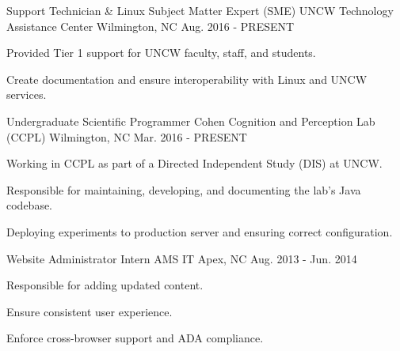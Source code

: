 

\begin{cventries}

  \cventry
    {Support Technician \& Linux Subject Matter Expert (SME)} %
    {UNCW Technology Assistance Center} %
    {Wilmington, NC} %
    {Aug. 2016 - PRESENT} %
    {
      \begin{cvitems} %
        \item {Provided Tier 1 support for UNCW faculty, staff, and students.}
        \item {Create documentation and ensure interoperability with Linux and UNCW services.}
      \end{cvitems}
    }

  \cventry
    {Undergraduate Scientific Programmer} %
    {Cohen Cognition and Perception Lab (CCPL)} %
    {Wilmington, NC} %
    {Mar. 2016 - PRESENT} %
    {
      \begin{cvitems}
        \item {Working in CCPL as part of a Directed Independent Study (DIS) at UNCW.}
        \item {Responsible for maintaining, developing, and documenting the lab's Java codebase.}
        \item {Deploying experiments to production server and ensuring correct configuration.}
      \end{cvitems}
    }
  \cventry
    {Website Administrator Intern} %
    {AMS IT} %
    {Apex, NC} %
    {Aug. 2013 - Jun. 2014} %
    {
      \begin{cvitems}
        \item {Responsible for adding updated content.}
        \item {Ensure consistent user experience.}
        \item {Enforce cross-browser support and ADA compliance.}
      \end{cvitems}
    }
\end{cventries}
